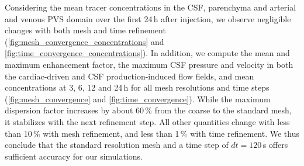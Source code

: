 Considering the mean tracer concentrations in the CSF, parenchyma and arterial and venous PVS domain over the first 24\,h after injection, we observe negligible changes with both mesh and time refinement (\cref{fig:mesh_convergence_concentrations} and 
\ref{fig:time_convergence_concentrations}). In addition, we compute the mean and maximum enhancement factor, the maximum CSF pressure and velocity in both the cardiac-driven and CSF production-induced flow fields, and mean concentrations at 3, 6, 12 and 24\,h for all mesh resolutions and time steps (\cref{fig:mesh_convergence} and \cref{fig:time_convergence}). While the maximum dispersion factor increases by about 60\,\% from the coarse to the standard mesh, it stabilizes with the next refinement step. All other quantities change with less than 10\,\% with mesh refinement, and less than 1\,\% with time refinement. We thus conclude that the standard resolution mesh and a time step of $dt=120\,$s offers sufficient accuracy for our simulations.


